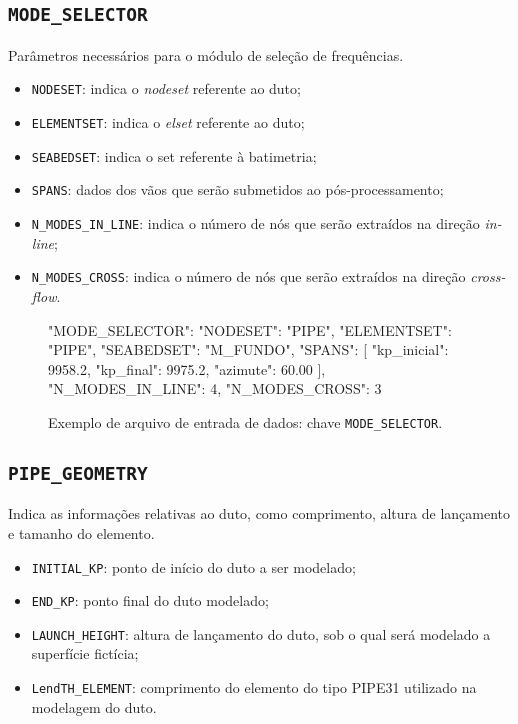 \subsection{\texttt{MODE\_SELECTOR}}

Parâmetros necessários para o módulo de seleção de frequências.

\begin{itemize}
  \item \texttt{NODESET}: indica o \textit{nodeset} referente ao duto;
  \item \texttt{ELEMENTSET}: indica o \textit{elset} referente ao duto;
  \item \texttt{SEABEDSET}: indica o set referente à batimetria;
  \item \texttt{SPANS}: dados dos vãos que serão submetidos ao pós-processamento;
  \item \texttt{N\_MODES\_IN\_LINE}: indica o número de nós que serão extraídos na direção \textit{in-line};
  \item \texttt{N\_MODES\_CROSS}: indica o número de nós que serão extraídos na direção \textit{cross-flow}.
\end{itemize}

\begin{figure}
\caption{Exemplo de arquivo de entrada de dados: chave \texttt{MODE\_SELECTOR}.\label{lst:mode-selector}}
\begin{jsoncode}
{
  "MODE_SELECTOR": {
    "NODESET": "PIPE",
    "ELEMENTSET": "PIPE",
    "SEABEDSET": "M_FUNDO",
    "SPANS": [
        {
          "kp_inicial": 9958.2,
          "kp_final": 9975.2,
          "azimute": 60.00
        }
      ],
    "N_MODES_IN_LINE": 4,
    "N_MODES_CROSS": 3
  }
}
\end{jsoncode}
\end{figure}


\subsection{\texttt{PIPE\_GEOMETRY}}


Indica as informações relativas ao duto, como comprimento, altura de lançamento e tamanho do elemento.

\begin{itemize}
  \item \texttt{INITIAL\_KP}: ponto de início do duto a ser modelado;
  \item \texttt{END\_KP}: ponto final do duto modelado;
  \item \texttt{LAUNCH\_HEIGHT}: altura de lançamento do duto, sob o qual será modelado a superfície fictícia;
  \item \texttt{LendTH\_ELEMENT}: comprimento do elemento do tipo PIPE31 utilizado na modelagem do duto.
\end{itemize}

